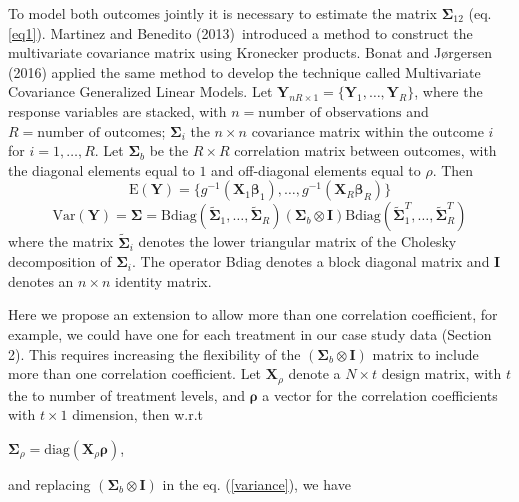 \documentclass[useAMS,referee]{biom}
\begin{document}
To model both outcomes jointly it is necessary to estimate the matrix $\boldsymbol{\Sigma}_{12}$ (eq. \ref{eq1}). Martinez and Benedito (2013)~\nocite{martinez2013general}introduced a method to construct the multivariate covariance matrix using Kronecker products. Bonat and J{\o}rgersen (2016) applied the same method to develop the technique called Multivariate Covariance Generalized Linear Models.
Let $\mathbf{Y}_{nR \times 1} = \{\mathbf{Y}_1, \dots ,\mathbf{Y}_R\} $, where the response variables are stacked, with $n = \mbox{number of observations}$ and $R = \mbox{number of outcomes}$; $\boldsymbol{\Sigma}_i$ the $n \times n$ covariance matrix within the outcome $i$ for $i = 1,\dots, R$. Let $\boldsymbol{\Sigma}_b$ be the $R \times R$ correlation matrix between outcomes, with the diagonal elements equal to $1$ and off-diagonal elements equal to $\rho$. 
Then 
\begin{equation*}
\mbox{E}(\mathbf{Y})	 = \{g^{-1}(\mathbf{X}_1 \boldsymbol{\beta}_1), \dots ,g^{-1}(\mathbf{X}_R \boldsymbol{\beta}_R)\} 
\end{equation*}
\begin{equation}\label{variance}	
\mbox{Var}(\mathbf{Y})=\boldsymbol{\Sigma}= \mbox{Bdiag}(\tilde{\boldsymbol{\Sigma}}_1, \dots , \tilde{\boldsymbol{\Sigma}}_R)(\boldsymbol{\Sigma}_b \otimes \mathbf{I} )\mbox{Bdiag}(\tilde{\boldsymbol{\Sigma}}_1^{T}, \dots , \boldsymbol{\tilde{\Sigma}}_R^{T})
\end{equation}
where the matrix $\boldsymbol{\tilde{\Sigma}}_i$ denotes the lower triangular matrix of the Cholesky decomposition of $\boldsymbol{\Sigma}_i$. The operator Bdiag denotes a block diagonal matrix and $\mathbf{I}$ denotes an $n \times n$ identity matrix. 


Here we propose an extension to allow more than one correlation coefficient, for example, we could have one for each treatment in our case study data (Section 2). This requires increasing the flexibility of the $(\boldsymbol{\Sigma}_b\otimes \mathbf{I})$ matrix to include more than one correlation coefficient.   
Let $\mathbf{X}_\rho$ denote a $N \times t$ design matrix, with $t$ the to number of treatment levels, and $\boldsymbol{\rho}$ a vector for the correlation coefficients  with $t \times 1$ dimension, then w.r.t
\begin{center}
$\boldsymbol{\Sigma}_\rho=	\mbox{diag}(\mathbf{X}_\rho \boldsymbol{\rho})$, 
\end{center}
and replacing $(\boldsymbol{\Sigma}_b\otimes \mathbf{I})$ in the eq. (\ref{variance}), we have
\end{document}

